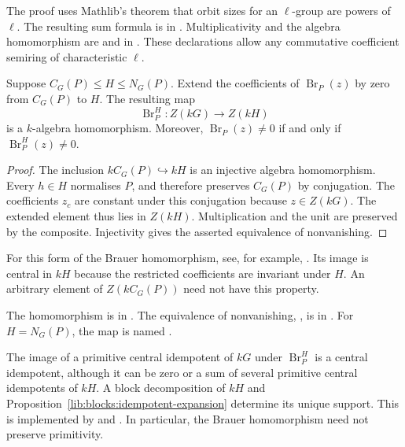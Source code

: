 \begin{implementation}
The proof uses Mathlib's theorem that orbit sizes for an $\ell$-group
are powers of $\ell$. The resulting sum formula is
in .
Multiplicativity and the algebra homomorphism are
 and
 in
.
These declarations allow any commutative coefficient semiring of
characteristic $\ell$.
\end{implementation}

\begin{proposition}
\label{lib:blocks:interval-map}
Suppose $C_G(P)\leq H\leq N_G(P)$. Extend the coefficients of
$\operatorname{Br}_P(z)$ by zero from $C_G(P)$ to $H$.
The resulting map
\[
 \operatorname{Br}_P^H:Z(kG)\longrightarrow Z(kH)
\]
is a $k$-algebra homomorphism. Moreover,
$\operatorname{Br}_P(z)\ne0$ if and only if
$\operatorname{Br}_P^H(z)\ne0$.
\end{proposition}
\begin{proof}
The inclusion $kC_G(P)\hookrightarrow kH$ is an injective algebra
homomorphism. Every $h\in H$ normalises $P$, and therefore preserves
$C_G(P)$ by conjugation. The coefficients $z_c$ are constant
under this conjugation because $z\in Z(kG)$. The extended element
thus lies in $Z(kH)$. Multiplication and the unit are preserved by the
composite. Injectivity gives the asserted equivalence of nonvanishing.
\end{proof}

For this form of the Brauer homomorphism, see, for example,
\cite[Theorem~4.9]{Navarro1998}. Its image is central in $kH$
because the restricted coefficients are invariant under $H$.
An arbitrary element of $Z(kC_G(P))$ need not have this property.

\begin{implementation}
The homomorphism  is in
.
The equivalence of nonvanishing,
,
is in .
For $H=N_G(P)$, the map is named
.
\end{implementation}

\begin{example}
The image of a primitive central idempotent of $kG$ under
$\operatorname{Br}_P^H$ is a central idempotent, although it can be
zero or a sum of several primitive central idempotents of $kH$. A block
decomposition of $kH$ and
Proposition~\ref{lib:blocks:idempotent-expansion} determine its unique
support. This is implemented by
 and
.
In particular, the Brauer homomorphism need not preserve primitivity.
\end{example}

